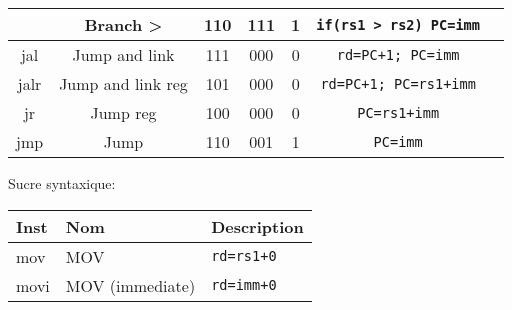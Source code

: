\documentclass[a4paper]{article}
\begin{document}
\begin{tabular}{|c|c|c|c|c|c|c|}
\begin{tabular}{|l|l|c|c|c|l|}
        bgt   & Branch >                        & 110    & 111    & 1      & \texttt{if(rs1 > rs2) PC=imm} \\
        \hline
        jal  & Jump and link                    & 111    & 000    & 0      &\texttt{rd=PC+1; PC=imm}       \\
        jalr & Jump and link reg                & 101    & 000    & 0      &\texttt{rd=PC+1; PC=rs1+imm}   \\
        jr   & Jump reg                         & 100    & 000    & 0      &\texttt{PC=rs1+imm}            \\
        jmp  & Jump                             & 110    & 001    & 1      &\texttt{PC=imm}                \\
        \hline
    \end{tabular}

    Sucre syntaxique:\\
    \begin{tabular}{|l|l|l|}
        \hline
        Inst & Nom             & Description       \\
        \hline
        mov  & MOV             & \texttt{rd=rs1+0} \\
        movi & MOV (immediate) & \texttt{rd=imm+0} \\
        \hline
    \end{tabular}
\end{document}
